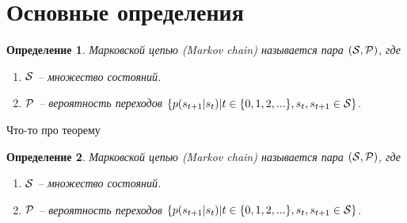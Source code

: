 \documentclass[12pt,draft]{article}
\begin{document}
\section*{Основные определения}

\newtheorem{definition}{Определение}
\begin{definition}
    Марковской цепью (Markov chain) называется пара 
    $(\mathbf{\cal S}, \mathbf{\cal P})$, где

    \begin{enumerate}
        \item $\mathbf{\cal S}$ -- множество состояний.
        \item $\mathbf{\cal P}$ -- вероятность переходов $\{p(s_{t+1}|s_{t}) 
        | t \in \{0, 1, 2, ...\}, s_{t}, s_{t+1} \in \mathbf{\cal S}\}$.
     \end{enumerate}


\end{definition}

Что-то про теорему
\begin{definition}
    
    Марковской цепью (Markov chain) называется пара 
    $(\mathbf{\cal S}, \mathbf{\cal P})$, где

    \begin{enumerate}
        \item $\mathbf{\cal S}$ -- множество состояний.
        \item $\mathbf{\cal P}$ -- вероятность переходов $\{p(s_{t+1}|s_{t}) 
        | t \in \{0, 1, 2, ...\}, s_{t}, s_{t+1} \in \mathbf{\cal S}\}$.
     \end{enumerate}


\end{definition}
\end{document}
